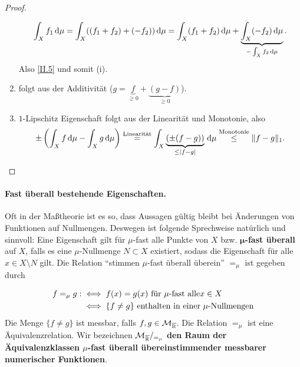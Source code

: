 \begin{satz}
\begin{proof}
\begin{enumerate}
\begin{equation*}
\begin{split}
\int_X f_1 \, \mathrm{d} \mu = \int_X ((f_1+f_2)+(-f_2))\, \mathrm{d}\mu = \int_X (f_1+f_2)\, \mathrm{d}\mu+ \underbrace{\int_X(-f_2)\, \mathrm{d}\mu}_{-\int_X f_2\, \mathrm{d}\mu}.
\end{split}
\end{equation*}
Also \eqref{II.5} und somit (i).
\item folgt aus der Additivität ($g=\underbrace{f}_{\geq 0}+\underbrace{(g-f)}_{\geq 0}$).
\item $1$-Lipschitz Eigenschaft folgt aus der Linearität und Monotonie, also
$$
\pm\left(
\int_Xf\, \mathrm{d}\mu-\int_Xg\, \mathrm{d}\mu
\right) \overset{\text{Linearität}}= \int_X\underbrace{(\pm(f-g))}_{\leq |f-g|}\, \mathrm{d}\mu\overset{\text{Monotonie}}\leq \|f-g\|_1.
$$
\end{enumerate}
\end{proof}
\end{satz}
\paragraph{Fast überall bestehende Eigenschaften.} Oft in der Maßtheorie ist es so, dass Aussagen gültig bleibt bei Änderungen von Funktionen auf Nullmengen. Deswegen ist folgende Sprechweise natürlich und sinnvoll: Eine Eigenschaft gilt für $\mu$-fast alle Punkte von $X$ bzw. $\boldsymbol\mu$\textbf{-fast überall} auf $X$, falls es eine $\mu$-Nullmenge $N\subset X$ existiert, sodass die Eigenschaft für alle $x\in X\setminus N$ gilt. Die Relation ``stimmen $\mu$-fast überall überein'' $=_\mu$ ist gegeben durch

\begin{equation*}
\begin{split}
f =_\mu g : &\iff f(x)=g(x) \  \text{für }\mu \text{-fast alle} x \in X 
\\ &\iff \{f\neq g\} \text{ enthalten in einer } \mu\text{-Nullmengen}
\end{split}
\end{equation*}
Die Menge $\{f\neq g\}$ ist messbar, falls $f,g \in \mathcal{M}_{\overline{\mathbb{R}}}$. Die Relation $=_\mu$ ist eine Äquivalenzrelation. Wir bezeichnen $\mathcal{M}_{\overline{\mathbb{R}}}/_{=_\mu}$ \textbf{den Raum der Äquivalenzklassen $\mu$-fast überall übereinstimmender messbarer numerischer Funktionen}.


